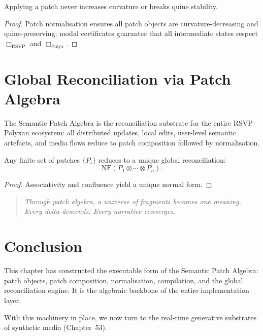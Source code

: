 \begin{theorem}[Soundness]
Applying a patch never increases curvature or breaks quine stability.
\end{theorem}

\begin{proof}
Patch normalisation ensures all patch objects are curvature-decreasing and
quine-preserving; modal certificates guarantee that all intermediate states
respect $\Box_{\mathrm{RSVP}}$ and $\Box_{\mathrm{Polyx}}$.
\end{proof}


\section{Global Reconciliation via Patch Algebra}
\label{sec:52:global-reconciliation}

The Semantic Patch Algebra is the reconciliation substrate for the entire
RSVP--Polyxan ecosystem: all distributed updates, local edits, user-level
semantic artefacts, and media flows reduce to patch composition followed by
normalisation.

\begin{theorem}
Any finite set of patches $\{P_i\}$ reduces to a unique global reconciliation:
\[
\mathrm{NF}(P_1\otimes\cdots\otimes P_n).
\]
\end{theorem}

\begin{proof}
Associativity and confluence yield a unique normal form.  
\end{proof}

\begin{quote}
\textit{Through patch algebra, a universe of fragments becomes one meaning.  
Every delta descends.  
Every narrative converges.}
\end{quote}


\section{Conclusion}
\label{sec:52:conclusion}

This chapter has constructed the executable form of the Semantic Patch Algebra:
patch objects, patch composition, normalisation, compilation, and the global
reconciliation engine.  
It is the algebraic backbone of the entire implementation layer.

With this machinery in place, we now turn to the real-time generative substrates
of synthetic media (Chapter~53).

